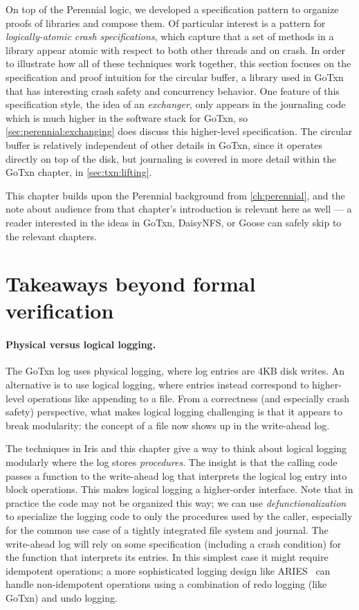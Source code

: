 On top of the Perennial logic, we developed a specification pattern to organize
proofs of libraries and compose them. Of particular interest is a pattern for
\emph{logically-atomic crash specifications}, which capture that a set of
methods in a library appear atomic with respect to both other threads and on
crash. In order to illustrate how all of these techniques work together, this
section focuses on the specification and proof intuition for the circular
buffer, a library used in GoTxn that has interesting crash safety and
concurrency behavior. One feature of this specification style, the idea of an
\emph{exchanger}, only appears in the journaling code which is much higher in
the software stack for GoTxn, so \cref{sec:perennial:exchanging} does discuss this
higher-level specification. The circular buffer is relatively independent
of other details in GoTxn, since it operates directly on top of the disk, but
journaling is covered in more detail within the GoTxn chapter, in
\cref{sec:txn:lifting}.

This chapter builds upon the Perennial background from \cref{ch:perennial}, and
the note about audience from that chapter's introduction is relevant here as
well --- a reader interested in the ideas in GoTxn, DaisyNFS, or Goose can
safely skip to the relevant chapters.




\section{Takeaways beyond formal verification}

\paragraph{Physical versus logical logging.} The GoTxn log uses physical
logging, where log entries are 4KB disk writes. An alternative is to use logical
logging, where entries instead correspond to higher-level operations like
appending to a file. From a correctness (and especially crash safety)
perspective, what makes logical logging challenging is that it appears to break
modularity: the concept of a file now shows up in the write-ahead log.

The techniques in Iris and this chapter give a way to think about logical
logging modularly where the log stores \emph{procedures}. The insight is that
the calling code passes a function to the write-ahead log that interprets the
logical log entry into block operations. This makes logical logging a
higher-order interface. Note that in practice the code may not be organized this
way; we can use \emph{defunctionalization} to specialize the logging code to
only the procedures used by the caller, especially for the common use case of a
tightly integrated file system and journal. The write-ahead log will rely on
some specification (including a crash condition) for the function that
interprets its entries. In this simplest case it might require idempotent
operations; a more sophisticated logging design like ARIES~\cite{mohan:aries}
can handle non-idempotent operations using a combination of redo logging (like
GoTxn) and undo logging.
